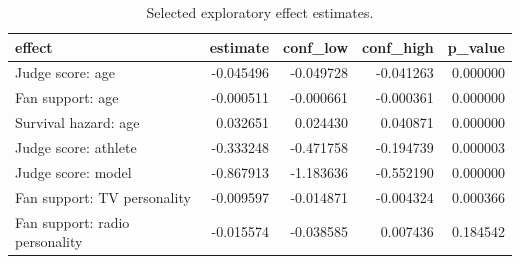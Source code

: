 \begin{table}
\caption{Selected exploratory effect estimates.}
\begin{tabular}{lrrrr}
\toprule
effect & estimate & conf\_low & conf\_high & p\_value \\
\midrule
Judge score: age & -0.045496 & -0.049728 & -0.041263 & 0.000000 \\
Fan support: age & -0.000511 & -0.000661 & -0.000361 & 0.000000 \\
Survival hazard: age & 0.032651 & 0.024430 & 0.040871 & 0.000000 \\
Judge score: athlete & -0.333248 & -0.471758 & -0.194739 & 0.000003 \\
Judge score: model & -0.867913 & -1.183636 & -0.552190 & 0.000000 \\
Fan support: TV personality & -0.009597 & -0.014871 & -0.004324 & 0.000366 \\
Fan support: radio personality & -0.015574 & -0.038585 & 0.007436 & 0.184542 \\
\bottomrule
\end{tabular}
\end{table}

